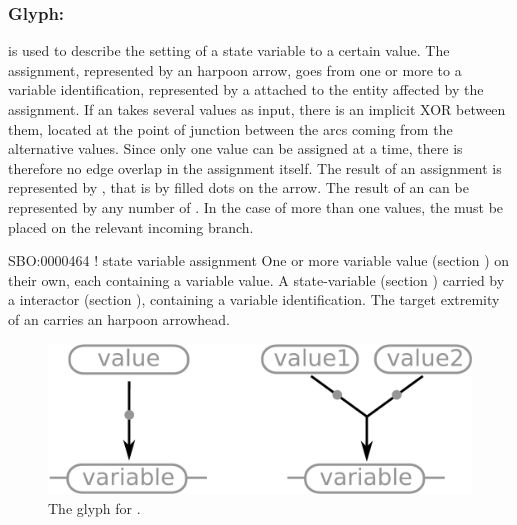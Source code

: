 
\subsubsection{Glyph: }\label{sec:assignment}

 is used to describe the setting of a state variable to a certain value. The assignment, represented by an harpoon arrow, goes from one or more  to a variable identification, represented by a  attached to the entity affected by the assignment. If an  takes several  values as input, there is an implicit XOR between them, located at the point of junction between the arcs coming from the alternative values. Since only one value can be assigned at a time, there is therefore no edge overlap in the assignment itself. The result of an assignment is represented by , that is by filled dots on the arrow. The result of an  can be represented by any number of . In the case of more than one  values, the  must be placed on the relevant incoming branch.

\begin{glyphDescription}
 \glyphSboTerm SBO:0000464 ! state variable assignment
 \glyphOrigin One or more variable value (section ) on their own, each containing a variable value.
 \glyphTarget A state-variable (section ) carried by a interactor (section ), containing a variable identification.
 \glyphEndPoint The target extremity of an  carries an harpoon arrowhead.
 \end{glyphDescription}

\begin{figure}[H]
  \centering
  \includegraphics[scale = 0.3]{images/assignment}
  \caption{The \ER glyph for .}
  \label{fig:assignment}
\end{figure}

